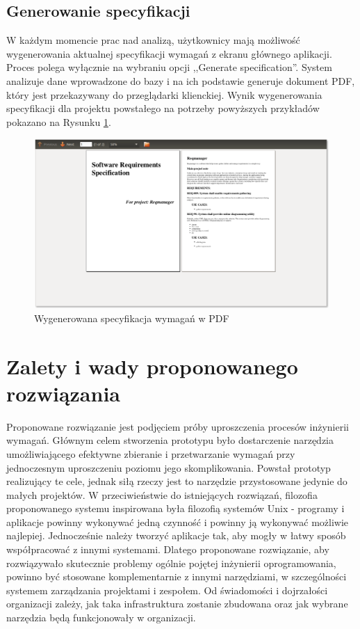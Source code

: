     \subsection{Generowanie specyfikacji}

      W każdym momencie prac nad analizą, użytkownicy mają możliwość wygenerowania aktualnej specyfikacji wymagań z ekranu głównego aplikacji. Proces polega wyłącznie na wybraniu opcji ,,Generate specification''. System analizuje dane wprowadzone do bazy i na ich podstawie generuje dokument PDF, który jest przekazywany do przeglądarki klienckiej. Wynik wygenerowania specyfikacji dla projektu powstałego na potrzeby powyższych przykładów pokazano na Rysunku \ref{fig:spec}.

      \begin{figure}[t]
        \centering
        \includegraphics[width=1.0\textwidth]{img/tut_9.png}
        \caption{Wygenerowana specyfikacja wymagań w PDF}
        \label{fig:spec}
      \end{figure}

  \newpage

  \section{Zalety i wady proponowanego rozwiązania}
    Proponowane rozwiązanie jest podjęciem próby uproszczenia procesów inżynierii wymagań. Głównym celem stworzenia prototypu było dostarczenie narzędzia umożliwiającego efektywne zbieranie i przetwarzanie wymagań przy jednoczesnym uproszczeniu poziomu jego skomplikowania. Powstał prototyp realizujący te cele, jednak siłą rzeczy jest to narzędzie przystosowane jedynie do małych projektów. W przeciwieństwie do istniejących rozwiązań, filozofia proponowanego systemu inspirowana była filozofią systemów Unix - programy i aplikacje powinny wykonywać jedną czynność i powinny ją wykonywać możliwie najlepiej. Jednocześnie należy tworzyć aplikacje tak, aby mogły w łatwy sposób współpracować z innymi systemami. Dlatego proponowane rozwiązanie, aby rozwiązywało skutecznie problemy ogólnie pojętej inżynierii oprogramowania, powinno być stosowane komplementarnie z innymi narzędziami, w szczególności systemem zarządzania projektami i zespołem. Od świadomości i dojrzałości organizacji zależy, jak taka infrastruktura zostanie zbudowana oraz jak wybrane narzędzia będą funkcjonowały w organizacji.

